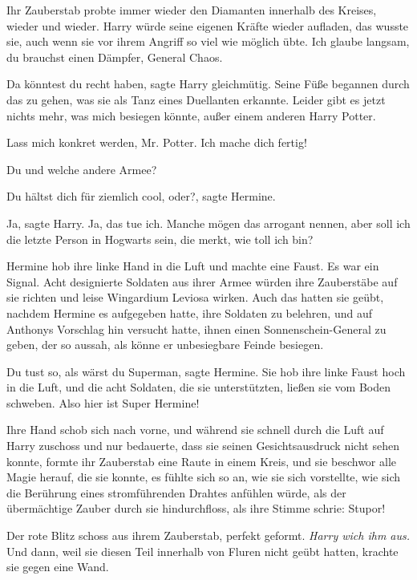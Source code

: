 Ihr Zauberstab probte immer wieder den Diamanten innerhalb des Kreises, wieder
und wieder. Harry würde seine eigenen Kräfte wieder aufladen, das wusste sie,
auch wenn sie vor ihrem Angriff so viel wie möglich übte. \glqq{}Ich glaube
langsam, du brauchst einen Dämpfer, General Chaos.\grqq{}

\glqq{}Da könntest du recht haben\grqq{}, sagte Harry gleichmütig. Seine Füße
begannen durch das zu gehen, was sie als Tanz eines Duellanten erkannte. \glqq{}
Leider gibt es jetzt nichts mehr, was mich besiegen könnte, außer einem anderen
Harry Potter.\grqq{}

\glqq{}Lass mich konkret werden, Mr. Potter. Ich mache dich fertig!\grqq{}

\glqq{}Du und welche andere Armee?\grqq{}

\glqq{}Du hältst dich für ziemlich cool, oder?\grqq{}, sagte Hermine.

\glqq{}Ja\grqq{}, sagte Harry. \glqq{}Ja, das tue ich. Manche mögen das arrogant
nennen, aber soll ich die letzte Person in Hogwarts sein, die merkt, wie toll
ich bin?\grqq{}

Hermine hob ihre linke Hand in die Luft und machte eine Faust. Es war ein
Signal. Acht designierte Soldaten aus ihrer Armee würden ihre Zauberstäbe auf
sie richten und leise Wingardium Leviosa wirken. Auch das hatten sie geübt,
nachdem Hermine es aufgegeben hatte, ihre Soldaten zu belehren, und auf Anthonys
Vorschlag hin versucht hatte, ihnen einen Sonnenschein-General zu geben, der so
aussah, als könne er unbesiegbare Feinde besiegen.

\glqq{}Du tust so, als wärst du Superman\grqq{}, sagte Hermine. Sie hob ihre
linke Faust hoch in die Luft, und die acht Soldaten, die sie unterstützten,
ließen sie vom Boden schweben. \glqq{}Also hier ist Super Hermine!\grqq{}

Ihre Hand schob sich nach vorne, und während sie schnell durch die Luft auf
Harry zuschoss und nur bedauerte, dass sie seinen Gesichtsausdruck nicht sehen
konnte, formte ihr Zauberstab eine Raute in einem Kreis, und sie beschwor alle
Magie herauf, die sie konnte, es fühlte sich so an, wie sie sich vorstellte, wie
sich die Berührung eines stromführenden Drahtes anfühlen würde, als der
übermächtige Zauber durch sie hindurchfloss, als ihre Stimme schrie: \glqq{}
Stupor!\grqq{}

Der rote Blitz schoss aus ihrem Zauberstab, perfekt geformt. \emph{Harry wich
ihm aus.} Und dann, weil sie diesen Teil innerhalb von Fluren nicht geübt
hatten, krachte sie gegen eine Wand.

